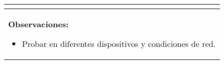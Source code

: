 \begin{table}[H]
\begin{center}
\begin{tabularx}{\textwidth}{|l|X|l|}
{\begin{itemize}
                \end{itemize}
            }\\
            \hline
            \multicolumn{3}{|p{\textwidth}|}{
                \textbf{Observaciones:}
                \begin{itemize}
                    \item Probar en diferentes dispositivos y condiciones de red.
                \end{itemize}
            }\\
            \hline
        \end{tabularx}
    \end{center}
\end{table}
